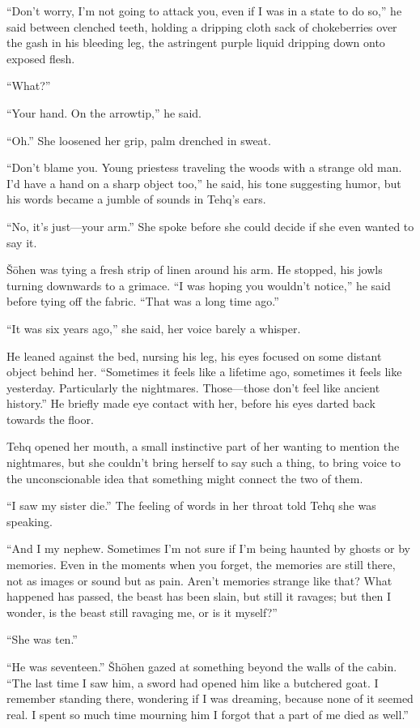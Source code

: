 ``Don't worry, I'm not going to attack you, even if I was in a state to do so,'' he said between clenched teeth, holding a dripping cloth sack of chokeberries over the gash in his bleeding leg, the astringent purple liquid dripping down onto exposed flesh.

``What?''

``Your hand. On the arrowtip,'' he said.

``Oh.'' She loosened her grip, palm drenched in sweat.

``Don't blame you. Young priestess traveling the woods with a strange old man. I'd have a hand on a sharp object too,'' he said, his tone suggesting humor, but his words became a jumble of sounds in Tehq's ears.

``No, it's just---your arm.'' She spoke before she could decide if she even wanted to say it.

Šōhen was tying a fresh strip of linen around his arm. He stopped, his jowls turning downwards to a grimace. ``I was hoping you wouldn't notice,'' he said before tying off the fabric. ``That was a long time ago.''

``It was six years ago,'' she said, her voice barely a whisper.

He leaned against the bed, nursing his leg, his eyes focused on some distant object behind her. ``Sometimes it feels like a lifetime ago, sometimes it feels like yesterday. Particularly the nightmares. Those---those don't feel like ancient history.'' He briefly made eye contact with her, before his eyes darted back towards the floor.

Tehq opened her mouth, a small instinctive part of her wanting to mention the nightmares, but she couldn't bring herself to say such a thing, to bring voice to the unconscionable idea that something might connect the two of them.

``I saw my sister die.'' The feeling of words in her throat told Tehq she was speaking.

``And I my nephew. Sometimes I'm not sure if I'm being haunted by ghosts or by memories. Even in the moments when you forget, the memories are still there, not as images or sound but as pain. Aren't memories strange like that? What happened has passed, the beast has been slain, but still it ravages; but then I wonder, is the beast still ravaging me, or is it myself?''

``She was ten.''

``He was seventeen.'' Šhōhen gazed at something beyond the walls of the cabin. ``The last time I saw him, a sword had opened him like a butchered goat. I remember standing there, wondering if I was dreaming, because none of it seemed real. I spent so much time mourning him I forgot that a part of me died as well.''

